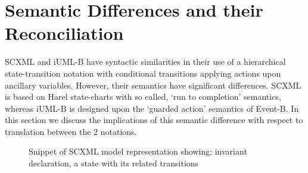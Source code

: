 
\section{Semantic Differences and their Reconciliation}
\label{sect:diff}


SCXML and iUML-B have syntactic similarities in their use of a hierarchical state-transition notation with conditional transitions applying actions upon ancillary variables.
However, their semantics have significant differences. SCXML is based on Harel state-charts with so called, `run to completion' semantics, whereas iUML-B is designed upon the `guarded action' semantics of Event-B.
In this section we discuss the implications of this semantic difference with respect to translation between the 2 notations.


\begin{figure}[tbp!]
  \caption{Snippet of SCXML model representation showing: 
  invariant declaration, a state with its related transitions} 
  \label{fig:scxml}
\end{figure}

